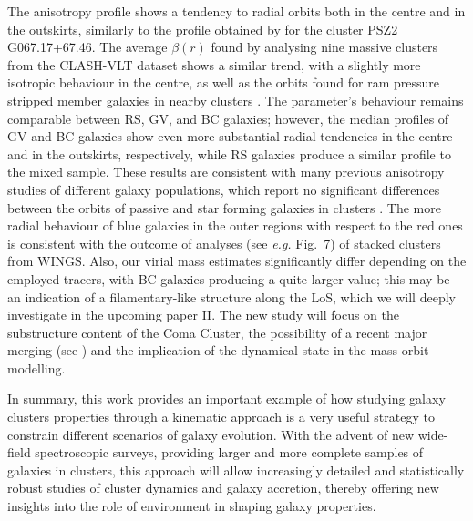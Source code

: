 \documentclass{aa}
\begin{document}
The anisotropy profile shows a tendency to radial orbits both in the centre and in the outskirts, similarly to the profile obtained by \citet{Pizzuti_2025b} for the cluster PSZ2 G067.17+67.46. %
The average $\beta(r)$ found by \citet{Biviano25} analysing nine massive clusters from the CLASH-VLT dataset shows a similar trend, with a slightly more isotropic behaviour in the centre, as well as the orbits found for ram pressure stripped member galaxies in nearby clusters \citep{Biviano24}. The parameter's behaviour remains comparable between RS, GV, and BC galaxies; however, the median profiles of GV and BC galaxies show even more substantial radial tendencies in the centre and in the outskirts, respectively, while RS galaxies produce a similar profile to the mixed sample. These results are consistent with many previous anisotropy studies of different galaxy populations, which report no significant differences between the orbits of passive and star forming galaxies in clusters \citep[\textit{e.g.}][]{Hwang_2008, Biviano_2013}. %
The more radial behaviour of blue galaxies in the outer regions with respect to the red ones is consistent with the outcome of \citet{Mamon_2019} analyses (see \textit{e.g.} Fig.~7) of stacked clusters from WINGS. 
Also, our virial mass estimates significantly differ depending on the employed tracers, with BC galaxies producing a quite larger value; this may be an indication of a filamentary-like structure along the LoS, which we will deeply investigate in the upcoming paper II. The new study will focus on the substructure content of the Coma Cluster, the possibility of a recent major merging (see \citealt{Biviano+96}) and the implication of the dynamical state in the mass-orbit modelling.


In summary, this work provides an important example of how studying galaxy clusters properties through a kinematic approach is a very useful strategy to constrain different scenarios of galaxy evolution. With the advent of new wide-field spectroscopic surveys, providing larger and more complete samples of galaxies in clusters, this approach will allow increasingly detailed and statistically robust studies of cluster dynamics and galaxy accretion, thereby offering new insights into the role of environment in shaping galaxy properties.
\end{document}
